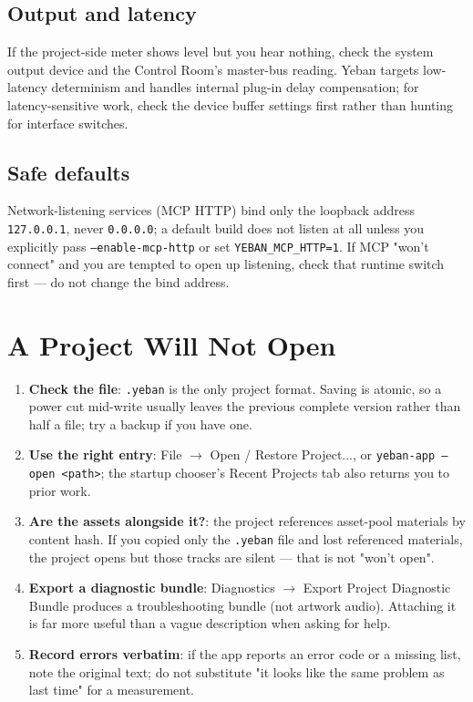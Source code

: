 \subsection{Output and latency}

If the project-side meter shows level but you hear nothing, check the system output
device and the Control Room's master-bus reading. Yeban targets low-latency
determinism and handles internal plug-in delay compensation; for latency-sensitive
work, check the device buffer settings first rather than hunting for interface switches.

\subsection{Safe defaults}

Network-listening services (MCP HTTP) bind only the loopback address \texttt{127.0.0.1},
never \texttt{0.0.0.0}; a default build does not listen at all unless you explicitly pass
\texttt{--enable-mcp-http} or set \texttt{YEBAN\_MCP\_HTTP=1}. If MCP "won't connect" and
you are tempted to open up listening, check that runtime switch first — do not change
the bind address.

\section{A Project Will Not Open}

\begin{enumerate}
  \item \textbf{Check the file}: \texttt{.yeban} is the only project format. Saving is atomic, so a power cut mid-write usually leaves the previous complete version rather than half a file; try a backup if you have one.
  \item \textbf{Use the right entry}: File $\to$ Open / Restore Project..., or \texttt{yeban-app --open <path>}; the startup chooser's Recent Projects tab also returns you to prior work.
  \item \textbf{Are the assets alongside it?}: the project references asset-pool materials by content hash. If you copied only the \texttt{.yeban} file and lost referenced materials, the project opens but those tracks are silent — that is not "won't open".
  \item \textbf{Export a diagnostic bundle}: Diagnostics $\to$ Export Project Diagnostic Bundle produces a troubleshooting bundle (not artwork audio). Attaching it is far more useful than a vague description when asking for help.
  \item \textbf{Record errors verbatim}: if the app reports an error code or a missing list, note the original text; do not substitute "it looks like the same problem as last time" for a measurement.
\end{enumerate}

